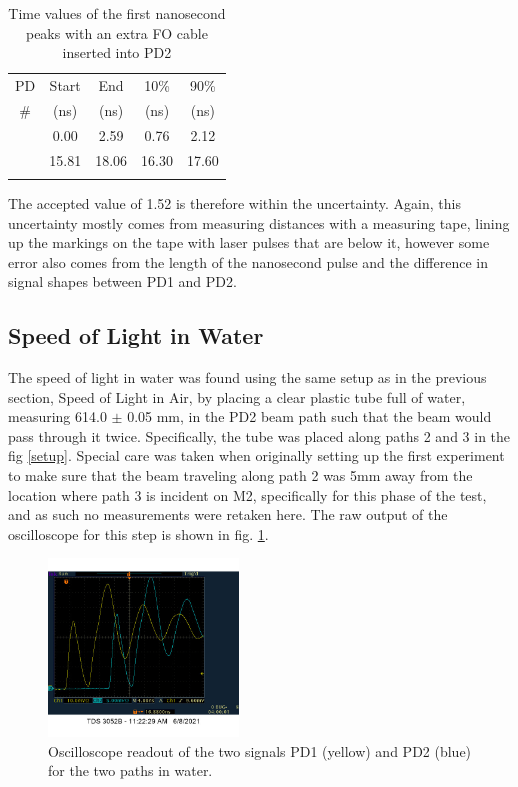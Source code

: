 \documentclass[aps,prl,reprint]{revtex4-2}
\begin{document}
\begin{table}[h]
\renewcommand{\arraystretch}{1.35}
\setlength{\tabcolsep}{10pt}
\caption{\label{TD_D2}Time values of the first nanosecond peaks with an extra FO cable inserted into PD2}
\begin{tabular}{|c|c|c|c|c|}
\toprule
PD & Start & End & 10\% & 90\% \\
\# & (ns)& (ns)& (ns)& (ns)\\
\colrule
1 &   0.00 &   2.59 &   0.76 &   2.12 \\
\colrule
2 &  15.81 &  18.06 &  16.30 &  17.60 \\
\hline
\botrule
\end{tabular}
\end{table}

The accepted value of 1.52 is therefore within the uncertainty. Again, this uncertainty
mostly comes from measuring distances with a measuring tape, lining up the markings
on the tape with laser pulses that are below it, however some error also comes from
the length of the nanosecond pulse and the difference in signal shapes between PD1 
and PD2. \\

\subsection{Speed of Light in Water}

The speed of light in water was found using the same setup as in the previous section,
Speed of Light in Air, by placing a clear plastic tube full of water, measuring 
614.0 $\pm$ 0.05 mm, in the PD2 beam path such that the beam would pass through it twice.
Specifically, the tube was placed along paths 2 and 3 in the fig \ref{setup}. Special
care was taken when originally setting up the first experiment to make sure that the
beam traveling along path 2 was 5mm away from the location where path 3 is incident
on M2, specifically for this phase of the test, and as such no measurements were
retaken here.  The raw output of the oscilloscope for this step is shown in fig. 
\ref{water_osc}. \\

\begin{figure}[h]
\includegraphics[width=0.45\textwidth]{./BMPs/l4_D_3_a.jpg}
\caption{\label{water_osc} Oscilloscope readout of the two signals PD1 (yellow) and PD2
	(blue) for the two paths in water. }
\end{figure}
\end{document}
